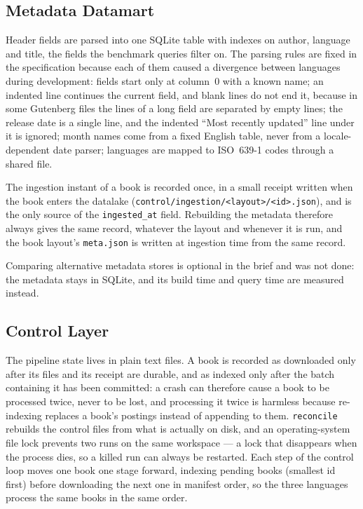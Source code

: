 \documentclass[12pt,a4paper]{article}
\begin{document}
	\subsection{Metadata Datamart}

	Header fields are parsed into one SQLite table with indexes on author, language and
	title, the fields the benchmark queries filter on. The parsing rules are fixed in the
	specification because each of them caused a divergence between languages during
	development: fields start only at column~0 with a known name; an indented line continues
	the current field, and blank lines do not end it, because in some Gutenberg files the
	lines of a long field are separated by empty lines; the release date is a single line, and the
	indented ``Most recently updated'' line under it is ignored; month names come from a
	fixed English table, never from a locale-dependent date parser; languages are mapped to
	ISO~639-1 codes through a shared file.

	The ingestion instant of a book is recorded once, in a small receipt written when the
	book enters the datalake (\texttt{control/ingestion/<layout>/<id>.json}), and is the only
	source of the \texttt{ingested\_at} field. Rebuilding the metadata therefore always
	gives the same record, whatever the layout and whenever it is run, and the book
	layout's \texttt{meta.json} is written at ingestion time from the same record.

	Comparing alternative metadata stores is optional in the brief and was not done: the
	metadata stays in SQLite, and its build time and query time are measured instead.

	\subsection{Control Layer}

	The pipeline state lives in plain text files. A book is recorded as downloaded only
	after its files and its receipt are durable, and as indexed only after the batch
	containing it has been committed: a crash can therefore cause a book to be processed
	twice, never to be lost, and processing it twice is harmless because re-indexing
	replaces a book's postings instead of appending to them. \texttt{reconcile} rebuilds the
	control files from what is actually on disk, and an operating-system file lock prevents
	two runs on the same workspace --- a lock that disappears when the process dies, so a
	killed run can always be restarted. Each step of the control loop moves one book one
	stage forward, indexing pending books (smallest id first) before downloading the next
	one in manifest order, so the three languages process the same books in the same order.
\end{document}
